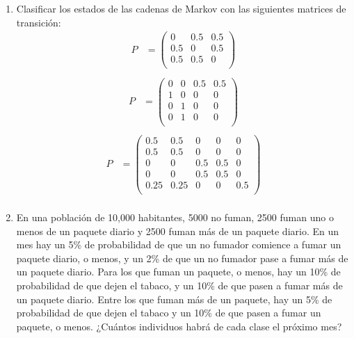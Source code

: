 \documentclass{templateNote}
\begin{document}
\begin{enumerate}
    \newpage
    \item Clasificar los estados de las cadenas de Markov con las siguientes matrices de transición:
    \begin{align*}
        P &= \left(
            \begin{array}{ccc}
                0 & 0.5 & 0.5 \\
                0.5 & 0   & 0.5 \\
                0.5 & 0.5 & 0   \\
            \end{array}
            \right)\\
    \end{align*}
    \begin{align*}
        P &= \left(
            \begin{array}{cccc}
                0   & 0   & 0.5 & 0.5\\
                1   & 0   & 0   & 0\\
                0   & 1   & 0   & 0\\
                0   & 1   & 0   & 0\\
            \end{array}
            \right)\\
    \end{align*}
    \begin{align*}
        P &= \left(
            \begin{array}{ccccc}    
                0.5 & 0.5 & 0   & 0   & 0\\
                0.5 & 0.5 & 0   & 0   & 0\\
                0   & 0   & 0.5 & 0.5 & 0\\
                0   & 0   & 0.5 & 0.5 & 0\\
                0.25& 0.25& 0   & 0   & 0.5\\
            \end{array}
            \right)\\
    \end{align*}

    \newpage
    \item En una población de 10,000 habitantes, 5000 no fuman, 2500 fuman uno o menos de un paquete diario y 2500 fuman más de un paquete diario. En un mes hay un 5\% de probabilidad de que un no fumador comience a fumar un paquete diario, o menos, y un 2\% de que un no fumador pase a fumar más de un paquete diario. Para los que fuman un paquete, o menos, hay un 10\% de probabilidad de que dejen el tabaco, y un 10\% de que pasen a fumar más de un paquete diario. Entre los que fuman más de un paquete, hay un 5\% de probabilidad de que dejen el tabaco y un 10\% de que pasen a fumar un paquete, o menos. ¿Cuántos individuos habrá de cada clase el próximo mes?
    

\end{enumerate}
\end{document}
